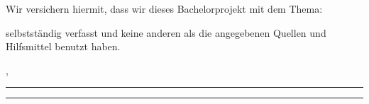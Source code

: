 \thispagestyle{empty}
\vspace*{2em}

Wir versichern hiermit, dass wir dieses Bachelorprojekt mit dem Thema:
\begin{center}
	\vspace{2em}
	\bf\large\myTopic\rm
	\vspace{2em}
\end{center}
\noindent selbstständig verfasst und keine anderen als die angegebenen Quellen und Hilfsmittel benutzt haben.

\vspace{4em}

\noindent \myEndPlace, \myEndDate
\vspace{4em}

\noindent\rule{6cm}{0.4pt}\hfill\rule{6cm}{0.4pt}\\
\myAutor\hfill\myAutorTwo